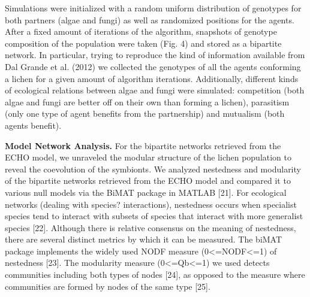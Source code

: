 Simulations were initialized with a random uniform distribution of genotypes for both partners (algae and fungi) as well as randomized positions for the agents. After a fixed amount of iterations of the algorithm, snapshots of genotype composition of the population were taken (Fig. 4) and stored as a bipartite network. In particular, trying to reproduce the kind of information available from Dal Grande et al. (2012) we collected the genotypes of all the agents conforming a lichen for a given amount of algorithm iterations. Additionally, different kinds of ecological relations between algae and fungi were simulated: competition (both algae and fungi are better off on their own than forming a lichen), parasitism (only one type of agent benefits from the partnership) and mutualism (both agents benefit).

\textbf{Model Network Analysis.} 
For the bipartite networks retrieved from the ECHO model, we unraveled the modular structure of the lichen population to reveal the coevolution of the symbionts. We analyzed nestedness and modularity of the bipartite networks retrieved from the ECHO model and compared it to various null models via the BiMAT package in MATLAB [21]. For ecological networks (dealing with species? interactions), nestedness occurs when specialist species tend to interact with subsets of species that interact with more generalist species [22]. Although there is relative consensus on the meaning of nestedness, there are several distinct metrics by which it can be measured. The biMAT package implements the widely used NODF measure (0<=NODF<=1) of nestedness [23]. The modularity measure (0<=Qb<=1) we used detects communities including both types of nodes [24], as opposed to the measure where communities are formed by nodes of the same type [25]. 



